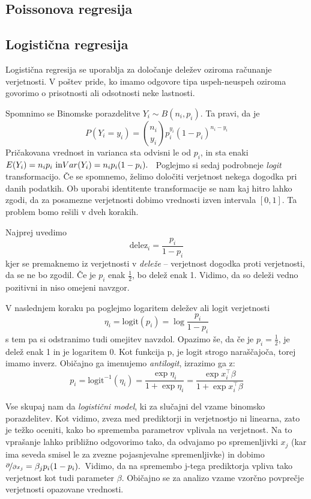 \documentclass[12pt,a4paper]{amsart}
\theoremstyle{definition} %
\theoremstyle{plain} %
\begin{document}
\subsection{Poissonova regresija}

\subsection{Logistična regresija}
Logistična regresija se uporablja za določanje deležev oziroma računanje verjetnosti. V poštev pride, ko imamo odgovore tipa uspeh-neuspeh oziroma
govorimo o prisotnosti ali odsotnosti neke lastnosti.

Spomnimo se Binomske porazdelitve $Y_{i} \sim B(n_{i}, p_{i})$. Ta pravi, da je 
\[
    P(Y_{i} = y_{i}) = {n_{i} \choose y_{i}} p_{i}^{y_{i}}(1 - p_{i}) ^{n_{i} - y_{i}}
\]
Pričakovana vrednost in varianca sta odvisni le od $p_{i}$, in sta enaki $E(Y_{i}) = n_{i}p_{i} \text{~in}\\Var(Y_{i}) = n_{i}p_{i}(1 - p_{i}).$~
Poglejmo si sedaj podrobneje \textit{logit} transformacijo. Če se spomnemo, želimo določiti verjetnost nekega dogodka pri danih podatkih. Ob uporabi
identitente transformacije se nam kaj hitro lahko zgodi, da za posamezne verjetnosti dobimo vrednosti izven intervala $[0,1]$. Ta problem bomo rešili v 
dveh korakih.

Najprej uvedimo 
\[ 
    \mathrm{delez}_{i} = \frac{p_{i}}{1 - p_{i}} %
\]
kjer se premaknemo iz verjetnosti v \textit{deleže} -- verjetnost dogodka proti verjetnosti, da se ne bo zgodil. Če je $p_{i}$ enak $\frac{1}{2}$, 
bo delež enak 1. Vidimo, da so deleži vedno pozitivni in niso omejeni navzgor.

V naslednjem koraku pa poglejmo logaritem deležev ali logit verjetnosti
\[
    \eta_{i} = \mathrm{logit}(p_{i}) = \log \frac{p_{i}}{1 - p_{i}}
\]
s tem pa si odstranimo tudi omejitev navzdol. Opazimo še, da če je $p_{i} = \frac{1}{2}$, je delež enak 1 in je logaritem 0. Kot funkcija p, je logit
strogo naraščajoča, torej imamo inverz. Običajno ga imenujemo \textit{antilogit}, izrazimo ga z:
\[
    p_{i} = \mathrm{logit}^{-1}(\eta_{i}) = \frac{\exp{\eta_{i}}}{1+\exp{\eta_{i}}} = \frac{\exp{x_{i}^\top\beta}}{1+\exp{x_{i}^\top\beta}}
\]

Vse skupaj nam da \textit{logistični model}, ki za slučajni del vzame binomsko porazdelitev. %
Kot vidimo, zveza med prediktorji in verjetnostjo ni linearna, zato je težko oceniti, kako bo sprememba parametrov
vplivala na verjetnost. Na to vprašanje lahko približno odgovorimo tako, da odvajamo po spremenljivki $x_{j}$ (kar ima seveda smisel le za zvezne
pojasnjevalne spremenljivke) in dobimo $\nicefrac{\partial}{\partial x_{j}} = \beta_{j}p_{i}(1 - p_{i}).$~Vidimo, da na spremembo j-tega prediktorja
vpliva tako verjetnost kot tudi parameter $\beta$. Običajno se za analizo vzame vzorčno povprečje verjetnosti opazovane vrednosti.
\end{document}
